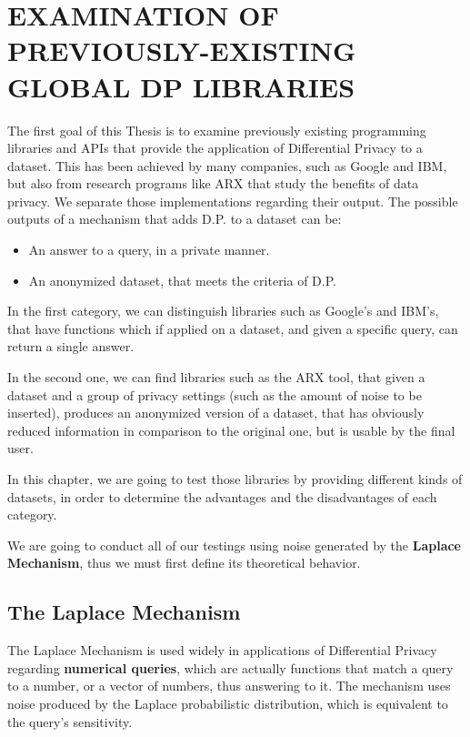 \chapter{EXAMINATION OF PREVIOUSLY-EXISTING GLOBAL DP LIBRARIES}

The first goal of this Thesis is to examine previously existing programming libraries and APIs that provide the application of Differential Privacy to a dataset. This has been achieved by many companies, such as Google and IBM, but also from research programs like ARX that study the benefits of data privacy. We separate those implementations regarding their output. The possible outputs of a mechanism that adds D.P. to a dataset can be:
\begin{itemize}
    \item An answer to a query, in a private manner.
    \item An anonymized dataset, that meets the criteria of D.P.
\end{itemize}

In the first category, we can distinguish libraries such as Google's and IBM's, that have functions which if applied on a dataset, and given a specific query, can return a single answer.

In the second one, we can find libraries such as the ARX tool, that given a dataset and a group of privacy settings (such as the amount of noise to be inserted), produces an anonymized version of a dataset, that has obviously reduced information in comparison to the original one, but is usable by the final user.

In this chapter, we are going to test those libraries by providing different kinds of datasets, in order to determine the advantages and the disadvantages of each category.

We are going to conduct all of our testings using noise generated by the \textbf{Laplace Mechanism}, thus we must first define its theoretical behavior.



\section{The Laplace Mechanism}

The Laplace Mechanism is used widely in applications of Differential Privacy regarding \textbf{numerical queries}, which are actually functions that match a query to a number, or a vector of numbers, thus answering to it. The mechanism uses noise produced by the Laplace probabilistic distribution, which is equivalent to the query's sensitivity.

